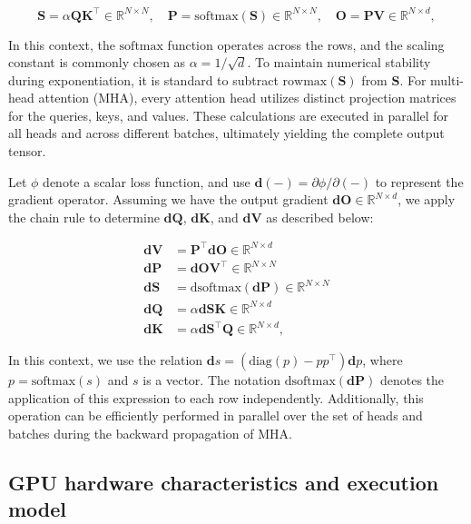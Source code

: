 \begin{equation*}
  \mathbf{S} = \alpha \mathbf{Q} \mathbf{K}^\top \in \mathbb{R}^{N \times N}, \quad \mathbf{P} = \mathrm{softmax}(\mathbf{S}) \in \mathbb{R}^{N \times N}, \quad \mathbf{O} = \mathbf{P}\mathbf{V} \in \mathbb{R}^{N \times d},
\end{equation*}

In this context, the $\mathrm{softmax}$ function operates across the rows, and the scaling constant is commonly chosen as $\alpha = 1/\sqrt{d}$. To maintain numerical stability during exponentiation, it is standard to subtract $\mathrm{rowmax}(\mathbf{S})$ from $\mathbf{S}$. For multi-head attention (MHA), every attention head utilizes distinct projection matrices for the queries, keys, and values. These calculations are executed in parallel for all heads and across different batches, ultimately yielding the complete output tensor.

Let $\phi$ denote a scalar loss function, and use $\mathbf{d}(-) = \partial \phi / \partial (-)$ to represent the gradient operator. Assuming we have the output gradient $\mathbf{dO} \in \mathbb{R}^{N \times d}$, we apply the chain rule to determine $\mathbf{dQ}$, $\mathbf{dK}$, and $\mathbf{dV}$ as described below:

\begin{align*}
  \mathbf{dV} &= \mathbf{P}^\top \mathbf{dO} \in \mathbb{R}^{N \times d} \\
  \mathbf{dP} &= \mathbf{dO} \mathbf{V}^\top \in \mathbb{R}^{N \times N} \\
  \mathbf{dS} &= \mathrm{dsoftmax} (\mathbf{dP}) \in \mathbb{R}^{N \times N} \\
  \mathbf{dQ} &= \alpha \mathbf{dS} \mathbf{K} \in \mathbb{R}^{N \times d} \\
  \mathbf{dK} &= \alpha \mathbf{dS}^\top \mathbf{Q} \in \mathbb{R}^{N \times d},
\end{align*}

In this context, we use the relation $\mathbf{d}s = (\mathrm{diag}(p) - p p^\top)\mathbf{d}p$, where $p = \mathrm{softmax}(s)$ and $s$ is a vector. The notation $\mathrm{dsoftmax}(\mathbf{dP})$ denotes the application of this expression to each row independently. Additionally, this operation can be efficiently performed in parallel over the set of heads and batches during the backward propagation of MHA.

\subsection{GPU hardware characteristics and execution model}
\label{subsec:hardware}

